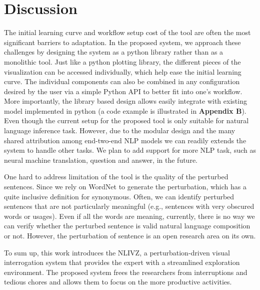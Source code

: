 \section{Discussion}
The initial learning curve and workflow setup cost of the tool are often the most significant barriers to adaptation.
In the proposed system, we approach these challenges by designing the system as a python library rather than as a monolithic tool. 
Just like a python plotting library, the different pieces of the visualization can be accessed individually, which help ease the initial learning curve. 
The individual components can also be combined in any configuration desired by the user via a simple Python API to better fit into one's workflow.
More importantly, the library based design allows easily integrate with existing model implemented in python (a code example is illustrated in \textbf{Appendix B}).
Even though the current setup for the proposed tool is only suitable for natural language inference task. However, due to the modular design and the many shared attribution among end-two-end NLP models we can readily extends the system to handle other tasks. We plan to add support for more NLP task, such as neural machine translation, question and answer, in the future.

One hard to address limitation of the tool is the quality of the perturbed sentences. 
Since we rely on WordNet to generate the perturbation, which has a quite inclusive definition for synonymous. Often, we can identify perturbed sentences that are not particularly meaningful (e.g., sentences with very obscured words or usages). 
Even if all the words are meaning, currently, there is no way we can verify whether the perturbed sentence is valid natural language composition or not.
%
However, the perturbation of sentence is an open research area on its own. 

To sum up, this work introduces the NLIVZ, a perturbation-driven visual interrogation system that provides the expert with a streamlined exploration environment. The proposed system frees the researchers from interruptions and tedious chores and allows them to focus on the more productive activities.


